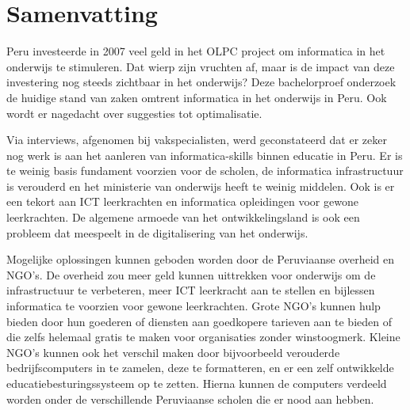 %
%

%

\chapter*{Samenvatting}
\label{ch:samenvatting}
Peru investeerde in 2007 veel geld in het OLPC project om informatica in het onderwijs te stimuleren. Dat wierp zijn vruchten af, maar is de impact van deze investering nog steeds zichtbaar in het onderwijs? Deze bachelorproef onderzoek de huidige stand van zaken omtrent informatica in het onderwijs in Peru. Ook wordt er nagedacht over suggesties tot optimalisatie. 

Via interviews, afgenomen bij vakspecialisten, werd geconstateerd dat er zeker nog werk is aan het aanleren van informatica-skills binnen educatie in Peru. Er is te weinig basis fundament voorzien voor de scholen, de informatica infrastructuur is verouderd en het ministerie van onderwijs heeft te weinig middelen. Ook is er een tekort aan ICT leerkrachten en informatica opleidingen voor gewone leerkrachten. De algemene armoede van het ontwikkelingsland is ook een probleem dat meespeelt in de digitalisering van het onderwijs. 

Mogelijke oplossingen kunnen geboden worden door de Peruviaanse overheid en NGO's. De overheid zou meer geld kunnen uittrekken voor onderwijs om de infrastructuur te verbeteren, meer ICT leerkracht aan te stellen en bijlessen informatica te voorzien voor gewone leerkrachten. Grote NGO's kunnen hulp bieden door hun goederen of diensten aan goedkopere tarieven aan te bieden of die zelfs helemaal gratis te maken voor organisaties zonder winstoogmerk. Kleine NGO's kunnen ook het verschil maken door bijvoorbeeld verouderde bedrijfscomputers in te zamelen, deze te formatteren, en er een zelf ontwikkelde educatiebesturingssysteem op te zetten. Hierna kunnen de computers verdeeld worden onder de verschillende Peruviaanse scholen die er nood aan hebben. 

